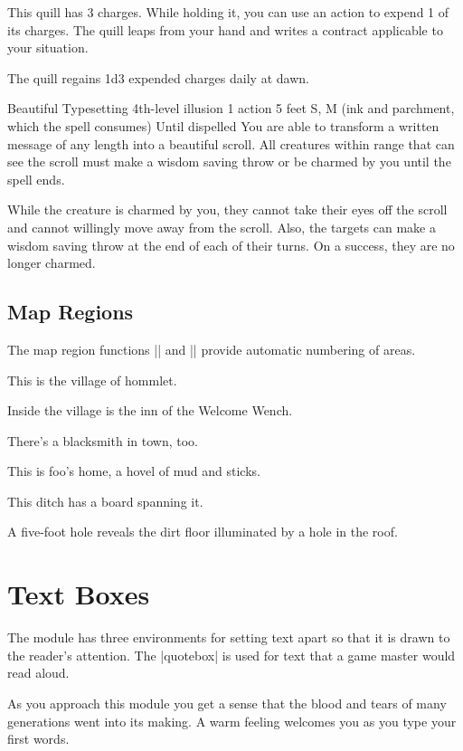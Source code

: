 \documentclass[letterpaper,twocolumn,openany]{dndbook}
\begin{document}
This quill has 3 charges. While holding it, you can use an action to expend 1 of its charges. The quill leaps from your hand and writes a contract applicable to your situation.

The quill regains 1d3 expended charges daily at dawn.

\spellheader%
  {Beautiful Typesetting}
  {4th-level illusion}
  {1 action}
  {5 feet}
  {S, M (ink and parchment, which the spell consumes)}
  {Until dispelled}
You are able to transform a written message of any length into a beautiful scroll. All creatures within range that can see the scroll must make a wisdom saving throw or be charmed by you until the spell ends.

While the creature is charmed by you, they cannot take their eyes off the scroll and cannot willingly move away from the scroll. Also, the targets can make a wisdom saving throw at the end of each of their turns. On a success, they are no longer charmed.

\section{Map Regions}
The map region functions |\area| and |\subarea| provide automatic numbering of areas.

This is the village of hommlet.

Inside the village is the inn of the Welcome Wench.

There's a blacksmith in town, too.

This is foo's home, a hovel of mud and sticks.

This ditch has a board spanning it.

A five-foot hole reveals the dirt floor illuminated by a hole in the roof.

\chapter{Text Boxes}

The module has three environments for setting text apart so that it is drawn to the reader's attention. The |quotebox| is used for text that a game master would read aloud.

\begin{quotebox}
  As you approach this module you get a sense that the blood and tears of many generations went into its making. A warm feeling welcomes you as you type your first words.
\end{quotebox}
\end{document}
